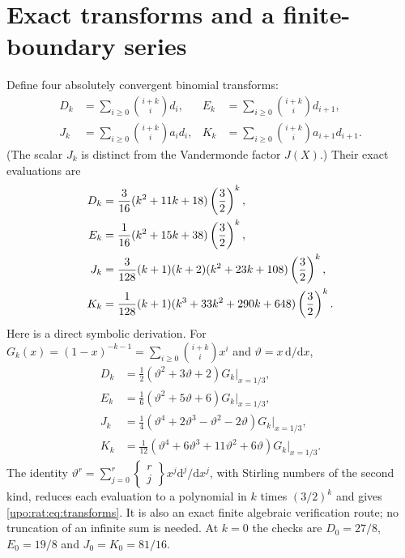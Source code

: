 \documentclass[11pt,letterpaper]{article}
\theoremstyle{remark}\newtheorem{remark}[theorem]{Remark}
\numberwithin{equation}{section}
\begin{document}
\section{Exact transforms and a finite-boundary series}\label{upo:rat:sec:transforms}
Define four absolutely convergent binomial transforms:
\begin{align*}
D_k&=\sum_{i\ge0}\binom{i+k}{i}d_i,&
E_k&=\sum_{i\ge0}\binom{i+k}{i}d_{i+1},\\
J_k&=\sum_{i\ge0}\binom{i+k}{i}a_id_i,&
K_k&=\sum_{i\ge0}\binom{i+k}{i}a_{i+1}d_{i+1}.
\end{align*}
(The scalar $J_k$ is distinct from the Vandermonde factor $J(X)$.)
Their exact evaluations are
\begin{align}
D_k&=\frac3{16}(k^2+11k+18)\left(\frac32\right)^k,\notag\\
E_k&=\frac1{16}(k^2+15k+38)\left(\frac32\right)^k,\notag\\
J_k&=\frac3{128}(k+1)(k+2)(k^2+23k+108)
\left(\frac32\right)^k,\label{upo:rat:eq:transforms}\\
K_k&=\frac1{128}(k+1)(k^3+33k^2+290k+648)
\left(\frac32\right)^k.\notag
\end{align}
Here is a direct symbolic derivation. For
$G_k(x)=(1-x)^{-k-1}=\sum_{i\ge0}\binom{i+k}{i}x^i$
and $\vartheta=x\,\mathrm d/\mathrm dx$,
\begin{align*}
D_k&=\tfrac12(\vartheta^2+3\vartheta+2)G_k\big|_{x=1/3},\\
E_k&=\tfrac16(\vartheta^2+5\vartheta+6)G_k\big|_{x=1/3},\\
J_k&=\tfrac14(\vartheta^4+2\vartheta^3-\vartheta^2-2\vartheta)
G_k\big|_{x=1/3},\\
K_k&=\tfrac1{12}(\vartheta^4+6\vartheta^3+11\vartheta^2+6\vartheta)
G_k\big|_{x=1/3}.
\end{align*}
The identity
$\vartheta^r=\sum_{j=0}^r\left\{\begin{smallmatrix}r\\j\end{smallmatrix}\right\}
x^j\mathrm d^j/\mathrm dx^j$, with Stirling numbers of the second kind,
reduces each evaluation to a polynomial in $k$ times $(3/2)^k$ and gives
\eqref{upo:rat:eq:transforms}. It is also an exact finite algebraic verification
route; no truncation of an infinite sum is needed.
At $k=0$ the checks are $D_0=27/8$, $E_0=19/8$ and
$J_0=K_0=81/16$.
\end{document}
